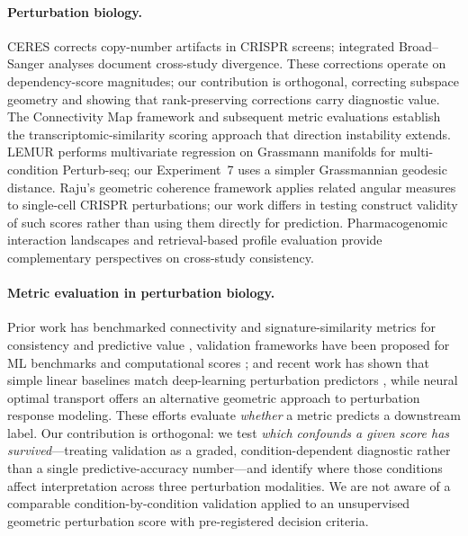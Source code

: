 \documentclass[11pt]{article}
\begin{document}
\paragraph{Perturbation biology.}
CERES \citep{meyers2017ceres} corrects copy-number artifacts in CRISPR
screens; integrated Broad--Sanger analyses \citep{pacini2021integrated}
document cross-study divergence. These corrections operate on
dependency-score magnitudes; our contribution is orthogonal, correcting
subspace geometry and showing that rank-preserving corrections carry
diagnostic value. The Connectivity Map framework
\citep{subramanian2017next,lamb2006connectivity} and subsequent metric
evaluations \citep{li2020comprehensive} establish the
transcriptomic-similarity scoring approach that direction instability extends.
LEMUR \citep{ahlmanneltze2025lemur} performs multivariate regression on
Grassmann manifolds for multi-condition Perturb-seq; our Experiment~7 uses
a simpler Grassmannian geodesic distance. Raju's geometric coherence
framework \citep{raju2026shesha} applies related angular measures to
single-cell CRISPR perturbations; our work differs in testing construct
validity of such scores rather than using them directly for prediction.
Pharmacogenomic interaction landscapes \citep{iorio2018unsupervised}
and retrieval-based profile evaluation \citep{kalinin2025versatile}
provide complementary perspectives on cross-study consistency.

\paragraph{Metric evaluation in perturbation biology.}
Prior work has benchmarked connectivity and signature-similarity metrics
for consistency and predictive value
\citep{subramanian2017next,li2020comprehensive,napolitano2021reconciling},
validation
frameworks have been proposed for ML benchmarks and computational scores
\citep{freiesleben2025benchmarking,watson2025measuring}; and recent work
has shown that simple linear baselines match deep-learning perturbation
predictors \citep{ahlmanneltze2025baseline}, while neural optimal
transport \citep{bunne2023cellot} offers an alternative geometric
approach to perturbation response modeling. These efforts
evaluate \emph{whether} a metric predicts a downstream label. Our
contribution is orthogonal: we test \emph{which confounds a given score
has survived}---treating validation as a graded, condition-dependent
diagnostic rather than a single predictive-accuracy number---and
identify where those conditions affect interpretation across three
perturbation modalities. We are not aware of a comparable
condition-by-condition validation applied to an unsupervised geometric
perturbation score with pre-registered decision criteria.
\end{document}

